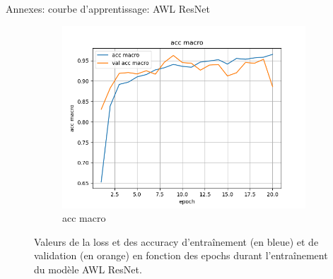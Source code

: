 \documentclass[11pt]{beamer}
\begin{document}
\begin{frame}{Annexes: courbe d'apprentissage: AWL ResNet}
\begin{figure}[ht]
        \begin{subfigure}{0.32\textwidth}
            \centering
            \includegraphics[width=\linewidth]{../logs/resnet_allw_img256_2/acc macro.png}
            \caption{acc macro}
        \end{subfigure}
        \caption{Valeurs de la loss et des accuracy d'entraînement (en bleue) et de validation (en orange) en fonction des epochs durant l'entraînement du modèle AWL ResNet.}
        \label{fig: train AWL ResNet}
    \end{figure}
\end{frame}
\end{document}
